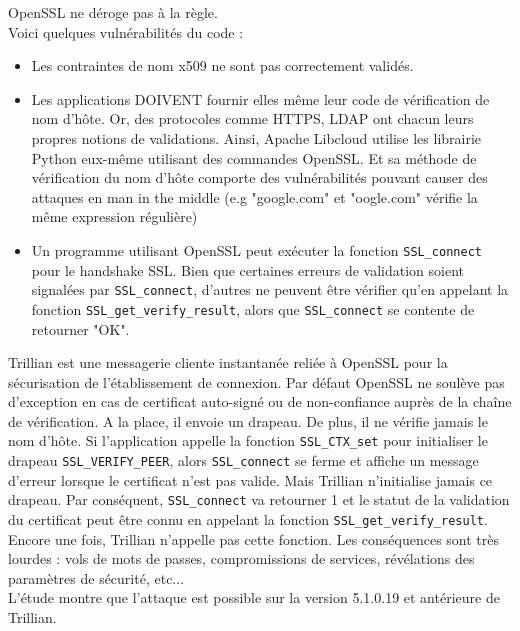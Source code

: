

OpenSSL ne déroge pas à la règle.\\
Voici quelques vulnérabilités du code :
\begin{itemize}
\item Les contraintes de nom x509 ne sont pas correctement validés.
\item Les applications DOIVENT fournir elles même leur code de vérification de nom d'hôte. Or, des protocoles comme HTTPS, LDAP ont chacun leurs propres notions de validations. Ainsi, Apache Libcloud utilise les librairie Python eux-même utilisant des commandes OpenSSL. Et sa méthode de vérification du nom d'hôte comporte des vulnérabilités pouvant causer des attaques en man in the middle (e.g "google.com" et "oogle.com" vérifie la même expression régulière)
\item Un programme utilisant OpenSSL peut exécuter la fonction \texttt{SSL\_connect} pour le handshake SSL. Bien que certaines erreurs de validation soient signalées par \texttt{SSL\_connect}, d'autres ne peuvent être vérifier qu'en appelant la fonction \texttt{SSL\_get\_verify\_result}, alors que \texttt{SSL\_connect} se contente de retourner "OK".
\end{itemize}


Trillian est une messagerie cliente instantanée reliée à OpenSSL pour la sécurisation de l'établissement de connexion. Par défaut OpenSSL ne soulève pas d'exception en cas de certificat auto-signé ou de non-confiance auprès de la chaîne de vérification. A la place, il envoie un drapeau. De plus, il ne vérifie jamais le nom d'hôte. Si l'application appelle la fonction \texttt{SSL\_CTX\_set} pour initialiser le drapeau \texttt{SSL\_VERIFY\_PEER}, alors \texttt{SSL\_connect} se ferme et affiche un message d'erreur lorsque le certificat n'est pas valide. Mais Trillian n'initialise jamais ce drapeau. Par conséquent, \texttt{SSL\_connect} va retourner 1 et le statut de la validation du certificat peut être connu en appelant la fonction \texttt{SSL\_get\_verify\_result}. Encore une fois, Trillian n'appelle pas cette fonction. Les conséquences sont très lourdes : vols de mots de passes, compromissions de services, révélations des paramètres de sécurité, etc...\\


L'étude montre que l'attaque est possible sur la version 5.1.0.19 et antérieure de Trillian.

